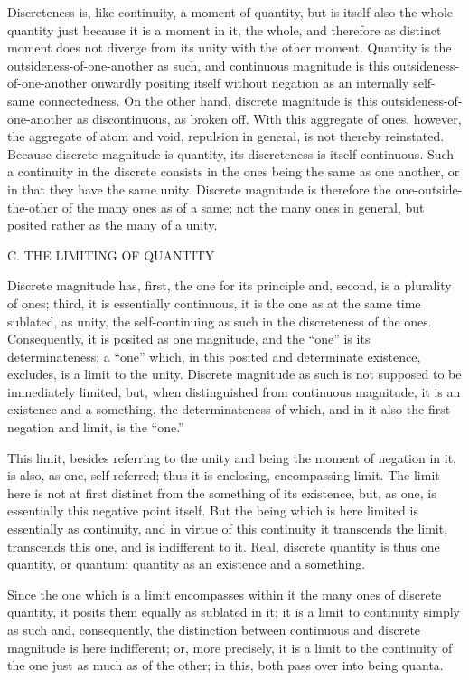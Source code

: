 Discreteness is, like continuity, a moment of quantity,
but is itself also the whole quantity
just because it is a moment in it, the whole,
and therefore as distinct moment does not
diverge from its unity with the other moment.
Quantity is the outsideness-of-one-another as such,
and continuous magnitude is this outsideness-of-one-another
onwardly positing itself without negation
as an internally self-same connectedness.
On the other hand, discrete magnitude is this
outsideness-of-one-another as discontinuous, as broken off.
With this aggregate of ones, however,
the aggregate of atom and void,
repulsion in general, is not thereby reinstated.
Because discrete magnitude is quantity,
its discreteness is itself continuous.
Such a continuity in the discrete consists
in the ones being the same as one another,
or in that they have the same unity.
Discrete magnitude is therefore
the one-outside-the-other of
the many ones as of a same;
not the many ones in general,
but posited rather as the many of a unity.

C. THE LIMITING OF QUANTITY

Discrete magnitude has,
first, the one for its principle
and, second, is a plurality of ones;
third, it is essentially continuous,
it is the one as at the same time
sublated, as unity,
the self-continuing as such in
the discreteness of the ones.
Consequently, it is posited as one magnitude,
and the “one” is its determinateness;
a “one” which, in this posited and determinate existence,
excludes, is a limit to the unity.
Discrete magnitude as such is not supposed
to be immediately limited,
but, when distinguished from continuous magnitude,
it is an existence and a something,
the determinateness of which,
and in it also the first negation and limit,
is the “one.”

This limit, besides referring to the unity
and being the moment of negation in it,
is also, as one, self-referred;
thus it is enclosing, encompassing limit.
The limit here is not at first distinct
from the something of its existence,
but, as one, is essentially this negative point itself.
But the being which is here limited is essentially as continuity,
and in virtue of this continuity it transcends the limit,
transcends this one, and is indifferent to it.
Real, discrete quantity is thus one quantity, or quantum:
quantity as an existence and a something.

Since the one which is a limit encompasses
within it the many ones of discrete quantity,
it posits them equally as sublated in it;
it is a limit to continuity simply as such
and, consequently, the distinction between
continuous and discrete magnitude is here indifferent;
or, more precisely, it is a limit to
the continuity of the one
just as much as of the other;
in this, both pass over into being quanta.

